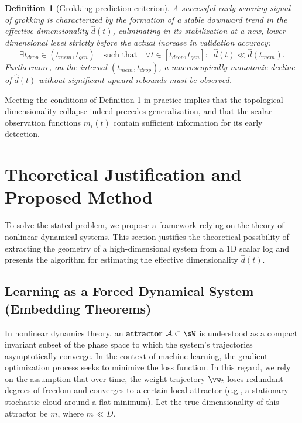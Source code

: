 \documentclass{article}
\newtheorem{definition}{Definition}
\begin{document}
\begin{definition}[Grokking prediction criterion]\label{def:criterion}
A successful early warning signal of grokking is characterized by the formation of a stable downward trend in the effective dimensionality $\hat{d}(t)$, culminating in its stabilization at a new, lower-dimensional level strictly before the actual increase in validation accuracy:
\begin{equation}
    \exists t_{drop} \in (t_{mem}, t_{gen}) \quad \text{such that} \quad \forall t \in [t_{drop}, t_{gen}]: \; \; \hat{d}(t) \ll \hat{d}(t_{mem}).
\end{equation}
Furthermore, on the interval $(t_{mem}, t_{drop})$, a macroscopically monotonic decline of $\hat{d}(t)$ without significant upward rebounds must be observed.
\end{definition}

Meeting the conditions of Definition \ref{def:criterion} in practice implies that the topological dimensionality collapse indeed precedes generalization, and that the scalar observation functions $m_i(t)$ contain sufficient information for its early detection.









\section{Theoretical Justification and Proposed Method}\label{sec:method}

To solve the stated problem, we propose a framework relying on the theory of nonlinear dynamical systems. This section justifies the theoretical possibility of extracting the geometry of a high-dimensional system from a 1D scalar log and presents the algorithm for estimating the effective dimensionality $\hat{d}(t)$.

\subsection{Learning as a Forced Dynamical System (Embedding Theorems)}

In nonlinear dynamics theory, an \textbf{attractor} $\mathcal{A} \subset \sW$ is understood as a compact invariant subset of the phase space to which the system's trajectories asymptotically converge. In the context of machine learning, the gradient optimization process seeks to minimize the loss function. In this regard, we rely on the assumption that over time, the weight trajectory $\vw_t$ loses redundant degrees of freedom and converges to a certain local attractor (e.g., a stationary stochastic cloud around a flat minimum). Let the true dimensionality of this attractor be $m$, where $m \ll D$.
\end{document}
